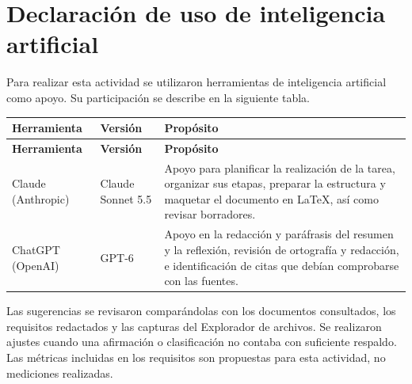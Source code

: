 \documentclass[10pt,a4paper]{article}
\begin{document}
\section{Declaración de uso de inteligencia artificial}

Para realizar esta actividad se utilizaron herramientas de inteligencia artificial como apoyo. Su participación se describe en la siguiente tabla.

{\small
\begin{longtable}{>{\raggedright\arraybackslash}p{2.9cm}
                  >{\raggedright\arraybackslash}p{2.6cm}
                  >{\raggedright\arraybackslash}p{8.3cm}}
\toprule
\textbf{Herramienta} & \textbf{Versión} & \textbf{Propósito} \\
\midrule
\endfirsthead
\toprule
\textbf{Herramienta} & \textbf{Versión} & \textbf{Propósito} \\
\midrule
\endhead
\bottomrule
\endfoot
Claude (Anthropic) & Claude Sonnet 5.5 & Apoyo para planificar la realización de la tarea, organizar sus etapas, preparar la estructura y maquetar el documento en LaTeX, así como revisar borradores. \\
ChatGPT (OpenAI) & GPT-6 & Apoyo en la redacción y paráfrasis del resumen y la reflexión, revisión de ortografía y redacción, e identificación de citas que debían comprobarse con las fuentes. \\
\end{longtable}
}

Las sugerencias se revisaron comparándolas con los documentos consultados, los requisitos redactados y las capturas del Explorador de archivos. Se realizaron ajustes cuando una afirmación o clasificación no contaba con suficiente respaldo. Las métricas incluidas en los requisitos son propuestas para esta actividad, no mediciones realizadas.

\printbibliography[title={Referencias}]
\end{document}
